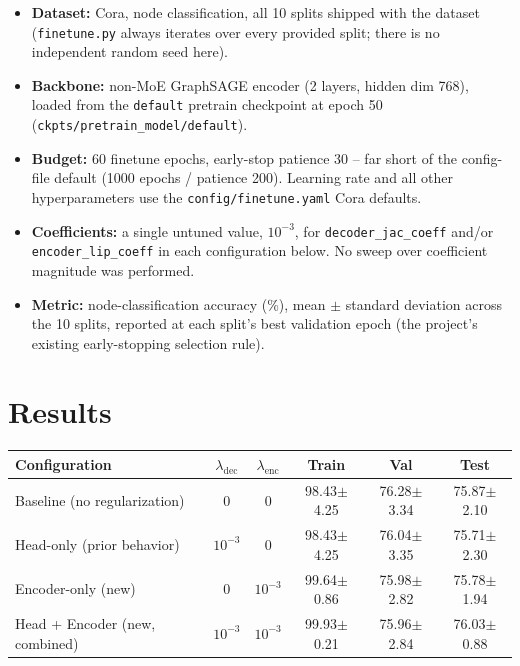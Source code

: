 \documentclass{article}
\newcommand{\score}[2]{#1{\scriptsize$\pm$#2}}
\begin{document}
\begin{itemize}
  \item \textbf{Dataset:} Cora, node classification, all 10 splits shipped
        with the dataset (\texttt{finetune.py} always iterates over every
        provided split; there is no independent random seed here).
  \item \textbf{Backbone:} non-MoE GraphSAGE encoder (2 layers,
        hidden dim 768), loaded from the \texttt{default} pretrain
        checkpoint at epoch 50 (\texttt{ckpts/pretrain\_model/default}).
  \item \textbf{Budget:} 60 finetune epochs, early-stop patience 30 --
        far short of the config-file default (1000 epochs / patience
        200). Learning rate and all other hyperparameters use the
        \texttt{config/finetune.yaml} Cora defaults.
  \item \textbf{Coefficients:} a single untuned value, $10^{-3}$, for
        \texttt{decoder\_jac\_coeff} and/or \texttt{encoder\_lip\_coeff}
        in each configuration below. No sweep over coefficient magnitude
        was performed.
  \item \textbf{Metric:} node-classification accuracy (\%), mean $\pm$
        standard deviation across the 10 splits, reported at each split's
        best validation epoch (the project's existing early-stopping
        selection rule).
\end{itemize}

\section{Results}
\label{sec:results}

\begin{center}
\begin{tabular}{lccccc}
\toprule
Configuration & $\lambda_{\text{dec}}$ & $\lambda_{\text{enc}}$ & Train & Val & Test \\
\midrule
Baseline (no regularization)     & 0     & 0     & \score{98.43}{4.25} & \score{76.28}{3.34} & \score{75.87}{2.10} \\
Head-only (prior behavior)       & $10^{-3}$ & 0     & \score{98.43}{4.25} & \score{76.04}{3.35} & \score{75.71}{2.30} \\
Encoder-only (new)               & 0     & $10^{-3}$ & \score{99.64}{0.86} & \score{75.98}{2.82} & \score{75.78}{1.94} \\
Head + Encoder (new, combined)   & $10^{-3}$ & $10^{-3}$ & \score{99.93}{0.21} & \score{75.96}{2.84} & \score{76.03}{0.88} \\
\bottomrule
\end{tabular}
\end{center}
\end{document}
